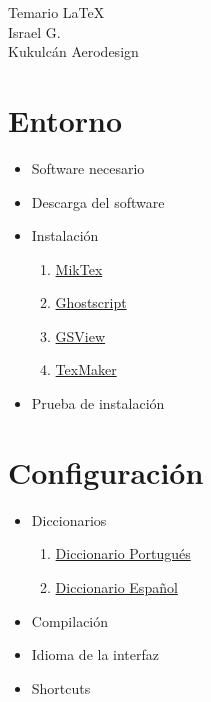 \documentclass[11pt,a4paper,pagesize,tablecaptionabove,abstracton,pointlessnumbers]{article}
\begin{document}
	\begin{center}
		{\Huge Temario \LaTeX}\\
		{\LARGE Israel G.}\\
		{\large Kukulcán Aerodesign}\\
	\end{center}

\section{Entorno}
\begin{itemize}
	\item Software necesario
	\item Descarga del software
	\item Instalación
		\begin{enumerate}
			\item \href{https://miktex.org/download}{MikTex}
			\item \href{https://sourceforge.net/projects/ghostscript/files/GPL\%20Ghostscript/}{Ghostscript}
			\item \href{http://pages.cs.wisc.edu/~ghost/gsview/get50.htm}{GSView}
			\item \href{http://www.xm1math.net/texmaker/download.html}{TexMaker}
		\end{enumerate}
	\item Prueba de instalación
\end{itemize}


\section{Configuración}
\begin{itemize}
	\item Diccionarios
	\begin{enumerate}
		\item \href{https://github.com/uefs/dic-ptbr-latex}{Diccionario Portugués}
		\item \href{https://github.com/uefs/dic-ptbr-latex}{Diccionario Español}
	\end{enumerate}
	\item Compilación
	\item Idioma de la interfaz
	\item Shortcuts
\end{itemize}
	
	
\end{document}
